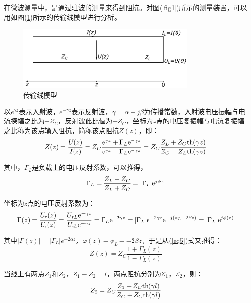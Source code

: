 \documentclass[a4paper]{article}
\begin{document}
在微波测量中，是通过驻波的测量来得到阻抗。对图(\ref{fig1})所示的测量装置，可以用如图(\ref{fig2})所示的传输线模型进行分析。
\begin{figure}[!h]
	\centering
	\includegraphics[width=0.8\textwidth]{fig/fig2.pdf}
	\caption{传输线模型}\label{fig2}
\end{figure}

以$e^{\gamma z}$表示入射波，$e^{-\gamma z}$表示反射波，$\gamma =\alpha + j\beta$为传播常数，入射波电压振幅与电流探幅之比为$+Z_C$，反射波此比值为$-Z_C$，坐标为$z$点的电压复振幅与电流复振幅之比称为该点输入阻抗，简称该点阻抗$Z(z)$，即：
\begin{equation}
	Z(z)=\frac{U(z)}{I(z)}=Z_C\frac{{\rm e}^{\gamma z}+\Gamma_L{\rm e}^{-\gamma z}}{{\rm e}^{\gamma z}-\Gamma_L{\rm e}^{-\gamma z}}=Z_C\frac{Z_L+Z_C\text{th}(\gamma z)}{Z_C+Z_L\text{th}(\gamma z)}\label{eq5}
\end{equation}

其中，$\Gamma_L$是负载上的电压反射系数，可以推得，
\begin{equation}
	\Gamma_L=\frac{Z_L-Z_C}{Z_L+Z_C}=|\Gamma_L|{\rm e}^{j\phi_L}\label{eq6}
\end{equation}

坐标为$z$点的电压反射系数为：
\begin{equation}
	\Gamma(z)=\frac{U_r(z)}{U_i(z)}=\frac{U_{rL}{\rm e}^{-\gamma z}}{U_{iL}{\rm e}^{+\gamma z}}=\Gamma_L\text{e}^{-2\gamma z}=|\Gamma_L|\text{e}^{-2\gamma z}\text{e}^{-j(\phi_L-2\beta z)}=|\Gamma_L|\text{e}^{j\phi(z)}\label{eq7}
\end{equation}

其中$|\Gamma (z)| = |\Gamma_L|e^{-2\alpha z}$，$\varphi (z) - \phi_L - -2\beta z$，于是从(\ref{eq5})式又推得：
\begin{equation}
	Z(z)=Z_C\frac{1+\Gamma_L(z)}{1-\Gamma_L(z)}\label{eq8}
\end{equation}

当线上有两点$Z_1$和$Z_2$，$Z_1 - Z_2 = l$，两点阻抗分别为$Z_1$，$Z_2$，则：
\begin{equation}
	Z_2=Z_C\frac{Z_1+Z_C\text{th}(\gamma l)}{Z_C+Z_C\text{th}(\gamma l)}\label{eq9}
\end{equation}
\end{document}
